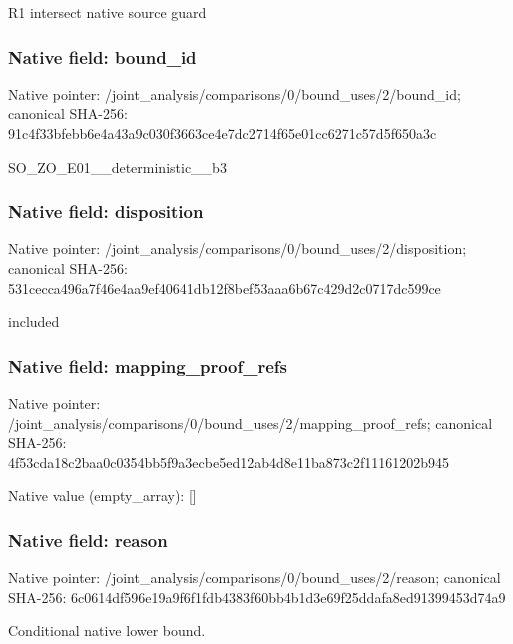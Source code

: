 \documentclass[10pt,a4paper]{article}
\begin{document}
\begingroup\raggedright\sloppy R1 intersect native source guard\par\endgroup

\subsubsection{Native field: bound\_\allowbreak{}id}
Native pointer: /joint\_\allowbreak{}analysis/comparisons/0/bound\_\allowbreak{}uses/2/bound\_\allowbreak{}id; canonical SHA-256: 91c4f33bfebb6e4a43a9c030f3663ce4e7dc2714f65e01cc6271c57d5f650a3c

\begingroup\raggedright\sloppy SO\_\allowbreak{}ZO\_\allowbreak{}E01\_\allowbreak{}\_\allowbreak{}deterministic\_\allowbreak{}\_\allowbreak{}b3\par\endgroup

\subsubsection{Native field: disposition}
Native pointer: /joint\_\allowbreak{}analysis/comparisons/0/bound\_\allowbreak{}uses/2/disposition; canonical SHA-256: 531cecca496a7f46e4aa9ef40641db12f8bef53aaa6b67c429d2c0717dc599ce

\begingroup\raggedright\sloppy included\par\endgroup

\subsubsection{Native field: mapping\_\allowbreak{}proof\_\allowbreak{}refs}
Native pointer: /joint\_\allowbreak{}analysis/comparisons/0/bound\_\allowbreak{}uses/2/mapping\_\allowbreak{}proof\_\allowbreak{}refs; canonical SHA-256: 4f53cda18c2baa0c0354bb5f9a3ecbe5ed12ab4d8e11ba873c2f11161202b945

Native value (empty\_\allowbreak{}array): []

\subsubsection{Native field: reason}
Native pointer: /joint\_\allowbreak{}analysis/comparisons/0/bound\_\allowbreak{}uses/2/reason; canonical SHA-256: 6c0614df596e19a9f6f1fdb4383f60bb4b1d3e69f25ddafa8ed91399453d74a9

\begingroup\raggedright\sloppy Conditional native lower bound.\par\endgroup
\end{document}
